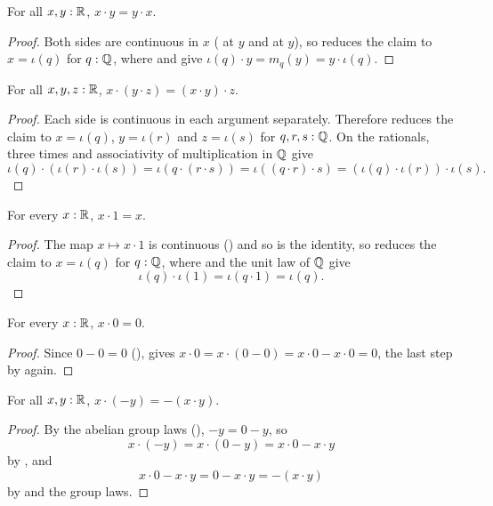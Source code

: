 \begin{lemma}
  \label{mulCommReal}
  For all $x, y : \mathbb{R}$, $x \cdot y = y \cdot x$.
\end{lemma}
\begin{proof}
  Both sides are continuous in $x$ ( at $y$ and  at $y$), so  reduces the claim to $x = \iota(q)$ for $q : \mathbb{Q}$, where  and  give $\iota(q) \cdot y = m_q(y) = y \cdot \iota(q)$.
\end{proof}

\begin{lemma}
  \label{mulAssocReal}
  For all $x, y, z : \mathbb{R}$, $x \cdot (y \cdot z) = (x \cdot y) \cdot z$.
\end{lemma}
\begin{proof}
  Each side is continuous in each argument separately. Therefore  reduces the claim to $x = \iota(q)$, $y = \iota(r)$ and $z = \iota(s)$ for $q, r, s : \mathbb{Q}$. On the rationals,  three times and associativity of multiplication in $\mathbb{Q}$ give
  \[
    \iota(q) \cdot (\iota(r) \cdot \iota(s)) = \iota(q \cdot (r \cdot s)) = \iota((q \cdot r) \cdot s) = (\iota(q) \cdot \iota(r)) \cdot \iota(s).
  \]
\end{proof}

\begin{lemma}
  \label{mulIdRReal}
  For every $x : \mathbb{R}$, $x \cdot 1 = x$.
\end{lemma}
\begin{proof}
  The map $x \mapsto x \cdot 1$ is continuous () and so is the identity, so  reduces the claim to $x = \iota(q)$ for $q : \mathbb{Q}$, where  and the unit law of $\mathbb{Q}$ give
  \[
    \iota(q) \cdot \iota(1) = \iota(q \cdot 1) = \iota(q).
  \]
\end{proof}

\begin{corollary}
  \label{mulAnnihilRReal}
  For every $x : \mathbb{R}$, $x \cdot 0 = 0$.
\end{corollary}
\begin{proof}
  Since $0 - 0 = 0$ (),  gives $x \cdot 0 = x \cdot (0 - 0) = x \cdot 0 - x \cdot 0 = 0$, the last step by  again.
\end{proof}

\begin{corollary}
  \label{negDistRMulReal}
  For all $x, y : \mathbb{R}$, $x \cdot (-y) = -(x \cdot y)$.
\end{corollary}
\begin{proof}
  By the abelian group laws (), $-y = 0 - y$, so
  \[
    x \cdot (-y) = x \cdot (0 - y) = x \cdot 0 - x \cdot y
  \]
  by , and
  \[
    x \cdot 0 - x \cdot y = 0 - x \cdot y = -(x \cdot y)
  \]
  by  and the group laws.
\end{proof}

